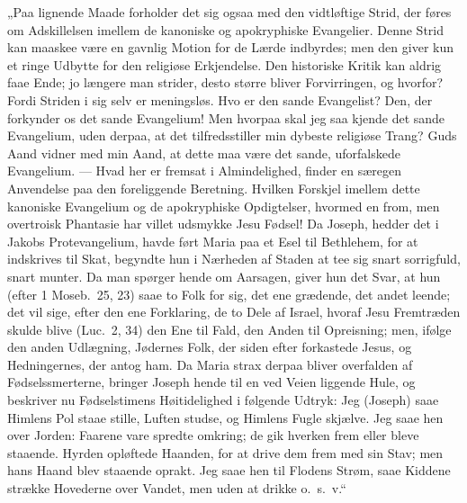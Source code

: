 \documentclass[12pt,a4paper]{book}
\begin{document}
„Paa lignende Maade forholder det sig ogsaa med den vidtløftige Strid, der føres om
Adskillelsen imellem de kanoniske og apokryphiske Evangelier. Denne Strid kan maaskee
være en gavnlig Motion for de Lærde indbyrdes; men den giver kun et ringe Udbytte for
den religiøse Erkjendelse. Den historiske Kritik kan aldrig faae Ende; jo længere man
strider, desto større bliver Forvirringen, og hvorfor? Fordi Striden i sig selv er
meningsløs. Hvo er den sande Evangelist? Den, der forkynder os det sande Evangelium! Men
hvorpaa skal jeg saa kjende det sande Evangelium, uden derpaa, at det tilfredsstiller
min dybeste religiøse Trang? Guds Aand vidner med min Aand, at dette maa være det sande,
uforfalskede Evangelium. --- Hvad her er fremsat i Almindelighed, finder en særegen
Anvendelse paa den foreliggende Beretning. Hvilken Forskjel imellem dette kanoniske
Evangelium og de apokryphiske Opdigtelser, hvormed en from, men overtroisk Phantasie har
villet udsmykke Jesu Fødsel! Da Joseph, hedder det i Jakobs Protevangelium, havde ført
Maria paa et Esel til Bethlehem, for at indskrives til Skat, begyndte hun i Nærheden af
Staden at tee sig snart sorrigfuld, snart munter. Da man spørger hende om Aarsagen,
giver hun det Svar, at hun (efter 1 Moseb.\ 25, 23) saae to
Folk for sig, det ene grædende, det andet leende; det vil sige, efter den ene Forklaring,
de to Dele af Israel, hvoraf Jesu Fremtræden skulde blive (Luc.\ 2, 34) den Ene til
Fald, den Anden til Opreisning; men, ifølge den anden Udlægning, Jødernes Folk, der siden
efter forkastede Jesus, og Hedningernes, der antog ham. Da Maria strax derpaa bliver
overfalden af Fødselssmerterne, bringer Joseph hende til en ved Veien liggende Hule, og
beskriver nu Fødselstimens Høitidelighed i følgende Udtryk: Jeg (Joseph) saae Himlens
Pol staae stille, Luften studse, og Himlens Fugle skjælve. Jeg saae hen over Jorden:
Faarene vare spredte omkring; de gik hverken frem eller bleve staaende. Hyrden opløftede
Haanden, for at drive dem frem med sin Stav; men hans Haand blev staaende oprakt. Jeg
saae hen til Flodens Strøm, saae Kiddene strække Hovederne over Vandet, men uden at
drikke o.\ s.\ v.“
\end{document}
